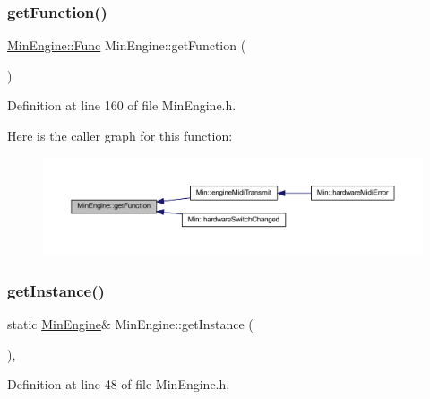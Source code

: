 \subsubsection{\texorpdfstring{get\+Function()}{getFunction()}}
{\footnotesize\ttfamily \hyperlink{class_min_engine_a30e1f14df71447889a8a5060cff6fbd8}{Min\+Engine\+::\+Func} Min\+Engine\+::get\+Function (\begin{DoxyParamCaption}{ }\end{DoxyParamCaption})\hspace{0.3cm}{\ttfamily [inline]}}



Definition at line 160 of file Min\+Engine.\+h.

Here is the caller graph for this function\+:
\nopagebreak
\begin{figure}[H]
\begin{center}
\leavevmode
\includegraphics[width=350pt]{d4/d0f/class_min_engine_a36831a348bb8157f2cc3a4720d92434e_icgraph}
\end{center}
\end{figure}
\mbox{\label{class_min_engine_a1af3fc41e2660fff51bbab55a09951ec}} 
\subsubsection{\texorpdfstring{get\+Instance()}{getInstance()}}
{\footnotesize\ttfamily static \hyperlink{class_min_engine}{Min\+Engine}\& Min\+Engine\+::get\+Instance (\begin{DoxyParamCaption}{ }\end{DoxyParamCaption})\hspace{0.3cm}{\ttfamily [inline]}, {\ttfamily [static]}}



Definition at line 48 of file Min\+Engine.\+h.

\mbox{\label{class_min_engine_a4d41a91ebf44df8b8d6912293a3a3452}} 
